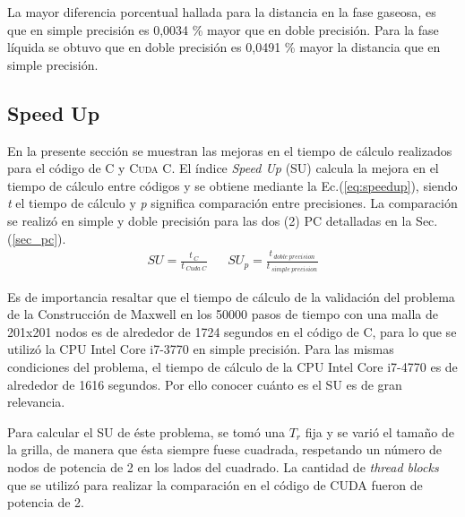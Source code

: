 
La mayor diferencia porcentual hallada para la distancia en la fase gaseosa, es que en simple precisión es 0,0034 \% mayor que en doble precisión. Para la fase líquida se obtuvo que en doble precisión es 0,0491 \% mayor la distancia que en simple precisión.


%

\newpage

\subsection{Speed Up}

En la presente sección se muestran las mejoras en el tiempo de cálculo realizados para el código de \textsc{C} y \textsc{Cuda C}. El índice \textit{Speed Up} (SU) calcula la mejora en el tiempo de cálculo entre códigos y se obtiene mediante la Ec.(\ref{eq:speedup}), siendo \textit{t} el tiempo de cálculo y \textit{p} significa comparación entre precisiones. La comparación se realizó en simple y doble precisión para las dos (2) PC detalladas en la Sec. (\ref{sec_pc}).
\begin{align}
	SU = \frac{t_{\>C}}{t_{\>Cuda \> C}} & & 	{SU}_p = \frac{t_{\>doble \> precision}}{t_{\>simple \> precision}} 
	\label{eq:speedup}
\end{align}

Es de importancia resaltar que el tiempo de cálculo de la validación del problema de la Construcción de Maxwell en los 50000 pasos de tiempo con una malla de 201x201 nodos es de alrededor de 1724 segundos en el código de \textsc{C}, para lo que se utilizó la CPU Intel Core i7-3770 en simple precisión. 
Para las mismas condiciones del problema, el tiempo de cálculo de la CPU Intel Core i7-4770 es de alrededor de 1616 segundos. Por ello conocer cuánto es el SU es de gran relevancia.

Para calcular el \textsc{SU} de éste problema, se tomó una $T_r$ fija y se varió el tamaño de la grilla, de manera que ésta siempre fuese cuadrada, respetando un número de nodos de potencia de 2 en los lados del cuadrado. La cantidad de \textit{thread blocks} que se utilizó para realizar la comparación en el código de \textsc{CUDA} fueron de potencia de 2.


